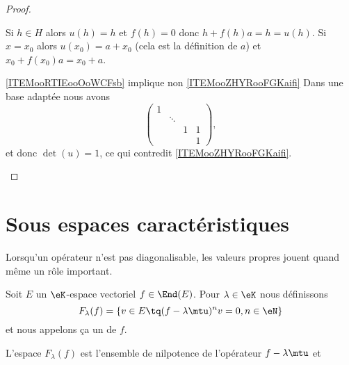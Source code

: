 \begin{proof}
\begin{subproof}
            Si \( h\in H\) alors \( u(h)=h\) et \( f(h)=0\) donc \( h+f(h)a=h=u(h)\). Si \( x=x_0\) alors \( u(x_0)=a+x_0\) (cela est la définition de \( a\)) et\( x_0+f(x_0)a=x_0+a\).
        \item[\ref{ITEMooRTIEooOoWCFsb} implique non \ref{ITEMooZHYRooFGKaifi}]
           Dans une base adaptée nous avons 
           \begin{equation}
               \begin{pmatrix}
                    1    &       &       &       \\
                        &   \ddots    &       &       \\
                        &       &   1    &   1    \\ 
                        &       &       &   1     
                \end{pmatrix},
           \end{equation}
           et donc \( \det(u)=1\), ce qui contredit \ref{ITEMooZHYRooFGKaifi}.
    \end{subproof}
\end{proof}



\section{Sous espaces caractéristiques}


Lorsqu'un opérateur n'est pas diagonalisable, les valeurs propres jouent quand même un rôle important.

\begin{definition}  \label{DefFBNIooCGbIix}
    Soit \( E\) un \( \eK\)-espace vectoriel  \( f\in\End(E)\). Pour \( \lambda\in \eK\) nous définissons
    \begin{equation}
        F_{\lambda}(f)=\{ v\in E\tq (f-\lambda\mtu)^nv=0, n\in\eN \}
    \end{equation}
    et nous appelons ça un  de \( f\).
\end{definition}
L'espace \( F_{\lambda}(f)\) est l'ensemble de nilpotence de l'opérateur \( f-\lambda\mtu\) et

